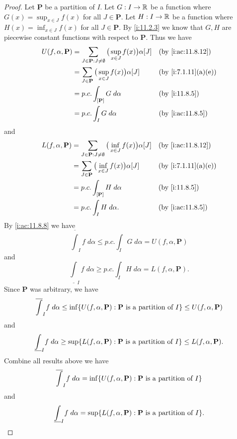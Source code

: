 \begin{proof}
  Let \(\mathbf{P}\) be a partition of \(I\).
  Let \(G : I \to \mathbb{R}\) be a function where \(G(x) = \sup_{x \in J} f(x)\) for all \(J \in \mathbf{P}\).
  Let \(H : I \to \mathbb{R}\) be a function where \(H(x) = \inf_{x \in J} f(x)\) for all \(J \in \mathbf{P}\).
  By \cref{i:11.2.3} we know that \(G, H\) are piecewise constant functions with respect to \(\mathbf{P}\).
  Thus we have
  \begin{align*}
    U(f, \alpha, \mathbf{P}) & = \sum_{J \in \mathbf{P} : J \neq \emptyset} \big(\sup_{x \in J} f(x)\big) \alpha[J] &  & \by{i:ac:11.8.12}  \\
                             & = \sum_{J \in \mathbf{P}} \big(\sup_{x \in J} f(x)\big) \alpha[J]                    &  & \by{i:7.1.11}[a,e] \\
                             & = p.c. \int_{[\mathbf{P}]} G \; d \alpha                                             &  & \by{i:11.8.5}      \\
                             & = p.c. \int_I G \; d \alpha                                                          &  & \by{i:ac:11.8.5}
  \end{align*}
  and
  \begin{align*}
    L(f, \alpha, \mathbf{P}) & = \sum_{J \in \mathbf{P} : J \neq \emptyset} \big(\inf_{x \in J} f(x)\big) \alpha[J] &  & \by{i:ac:11.8.12}  \\
                             & = \sum_{J \in \mathbf{P}} \big(\inf_{x \in J} f(x)\big) \alpha[J]                    &  & \by{i:7.1.11}[a,e] \\
                             & = p.c. \int_{[\mathbf{P}]} H \; d \alpha                                             &  & \by{i:11.8.5}      \\
                             & = p.c. \int_I H \; d \alpha.                                                         &  & \by{i:ac:11.8.5}
  \end{align*}
  By \cref{i:ac:11.8.8} we have
  \[
    \overline{\int}_I f \; d \alpha \leq p.c. \int_I G \; d \alpha = U(f, \alpha, \mathbf{P})
  \]
  and
  \[
    \underline{\int}_I f \; d \alpha \geq p.c. \int_I H \; d \alpha = L(f, \alpha, \mathbf{P}).
  \]
  Since \(\mathbf{P}\) was arbitrary, we have
  \[
    \overline{\int}_I f \; d \alpha \leq \inf\set{U(f, \alpha, \mathbf{P}) : \mathbf{P} \text{ is a partition of } I} \leq U(f, \alpha, \mathbf{P})
  \]
  and
  \[
    \underline{\int}_I f \; d \alpha \geq \sup\set{L(f, \alpha, \mathbf{P}) : \mathbf{P} \text{ is a partition of } I} \leq L(f, \alpha, \mathbf{P}).
  \]
  Combine all results above we have
  \[
    \overline{\int}_I f \; d \alpha = \inf\set{U(f, \alpha, \mathbf{P}) : \mathbf{P} \text{ is a partition of } I}
  \]
  and
  \[
    \underline{\int}_I f \; d \alpha = \sup\set{L(f, \alpha, \mathbf{P}) : \mathbf{P} \text{ is a partition of } I}.
  \]
\end{proof}


